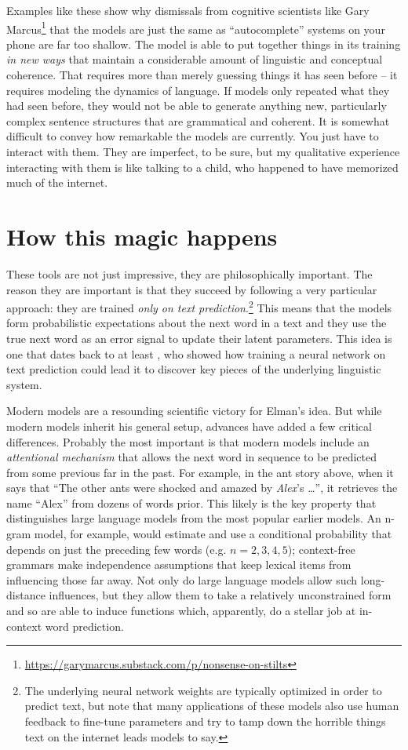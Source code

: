 \documentclass[output=paper,colorlinks,citecolor=brown
]{langscibook}
\begin{document}
Examples like these show why dismissals from cognitive scientists like Gary Marcus\footnote{ \url{https://garymarcus.substack.com/p/nonsense-on-stilts}} that the models are just the same as ``autocomplete'' systems on your phone are far too shallow. The model is able to put together things in its training \textit{in new ways} that maintain a considerable amount of linguistic and conceptual coherence. That requires more than merely guessing things it has seen before -- it requires modeling the dynamics of language. If models only repeated what they had seen before, they would not be able to generate anything new, particularly complex sentence structures that are grammatical and coherent. It is somewhat difficult to convey how remarkable the models are currently. You just have to interact with them. They are imperfect, to be sure, but my qualitative experience interacting with them is like talking to a child, who happened to have memorized much of the internet. 

\section{How this magic happens}

These tools are not just impressive, they are philosophically important. The reason they are important is that they succeed by following a very particular approach: they are trained \textit{only on text prediction}.\footnote{The underlying neural network weights are typically optimized in order to predict text, but note that many applications of these models also use human feedback to fine-tune parameters and try to tamp down the horrible things text on the internet leads models to say.} This means that the models form probabilistic expectations about the next word in a text and they use the true next word as an error signal to update their latent parameters. This idea is one that dates back to at least \citet{elman1990finding}, who showed how training a neural network on text prediction could lead it to discover key pieces of the underlying linguistic system. 

Modern models are a resounding scientific victory for Elman's idea. But while modern models inherit his general setup, advances have added a few critical differences. Probably the most important is that modern models include an \textit{attentional mechanism} that allows the next word in sequence to be predicted from some previous far in the past. For example, in the ant story above,  when it says that ``The other ants were shocked and amazed by \textit{Alex}'s \ldots '', it retrieves the name ``Alex'' from dozens of words prior. This likely is the key property that distinguishes large language models from the most popular earlier models. An {n}-gram model, for example, would estimate and use a conditional probability that depends on just the preceding few words (e.g. $n=2,3,4,5$); context-free grammars make independence assumptions that keep lexical items from influencing those far away. Not only do large language models allow such long-distance influences, but they allow them to take a relatively unconstrained form and so are able to induce functions which, apparently, do a stellar job at in-context word prediction. 
\end{document}
